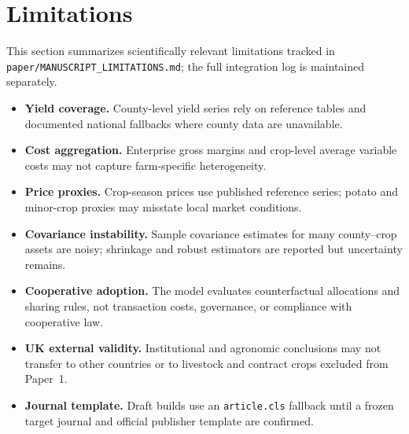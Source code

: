 \section{Limitations}
\label{sec:limitations}

This section summarizes scientifically relevant limitations tracked in
\texttt{paper/MANUSCRIPT\_LIMITATIONS.md}; the full integration log is maintained separately.

\begin{itemize}
  \item \textbf{Yield coverage.} County-level yield series rely on reference tables and
    documented national fallbacks where county data are unavailable.
  \item \textbf{Cost aggregation.} Enterprise gross margins and crop-level average variable
    costs may not capture farm-specific heterogeneity.
  \item \textbf{Price proxies.} Crop-season prices use published reference series; potato and
    minor-crop proxies may misstate local market conditions.
  \item \textbf{Covariance instability.} Sample covariance estimates for many county--crop
    assets are noisy; shrinkage and robust estimators are reported but uncertainty remains.
  \item \textbf{Cooperative adoption.} The model evaluates counterfactual allocations and
    sharing rules, not transaction costs, governance, or compliance with cooperative law.
  \item \textbf{UK external validity.} Institutional and agronomic conclusions may not
    transfer to other countries or to livestock and contract crops excluded from Paper~1.
  \item \textbf{Journal template.} Draft builds use an \texttt{article.cls} fallback until a
    frozen target journal and official publisher template are confirmed.
\end{itemize}
